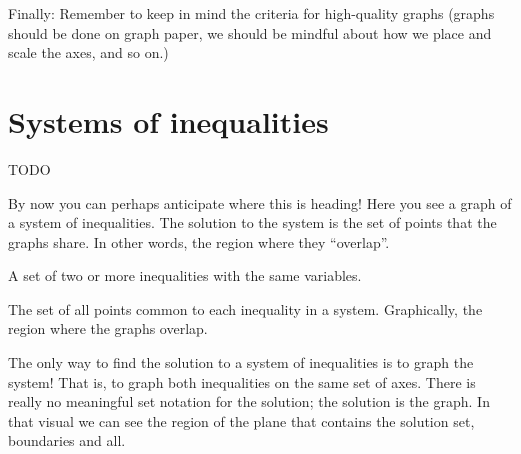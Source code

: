 Finally: Remember to keep in mind the criteria for high-quality graphs (graphs should be done on graph paper, we should be mindful about how we place and scale the axes, and so on.)

\section{Systems of inequalities}
\label{sec:ineqsystems}

\begin{boxedexplore}
TODO
\end{boxedexplore}

By now you can perhaps anticipate where this is heading! Here you see a graph of a system of inequalities. The solution to the system is the set of points that the graphs share. In other words, the region where they ``overlap''.

\begin{center}
\end{center}

\begin{boxeddef}
A set of two or more inequalities with the same variables.
\end{boxeddef}

\begin{boxeddef}
The set of all points common to each inequality in a system. Graphically, the region where the graphs overlap.
\end{boxeddef}

The only way to find the solution to a system of inequalities is to graph the system! That is, to graph both inequalities on the same set of axes. There is really no meaningful set notation for the solution; the solution is the graph. In that visual we can see the region of the plane that contains the solution set, boundaries and all.

